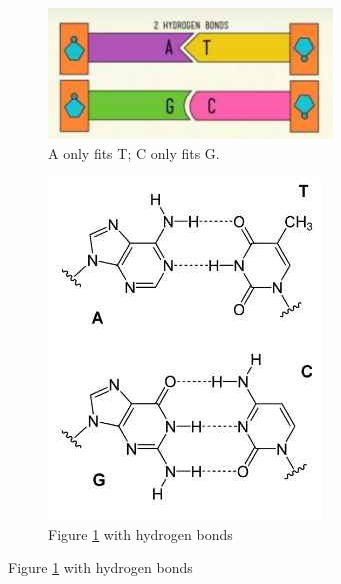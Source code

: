 \documentclass[]{article}
\begin{document}
\begin{figure}[H]
		\caption{Base Pairs}
		\begin{subfigure}[t]{0.4\textwidth}
			\caption{A only fits T; C only fits G.}\label{fig:BasePairsML}
			\includegraphics[width=\textwidth]{BasePairsML}
		\end{subfigure}
		\begin{subfigure}[t]{0.55\textwidth}
			\caption{Figure \ref{fig:BasePairsML} with hydrogen bonds}\label{fig:BasePairsML_hydrogen_bonds}
			\includegraphics[width=\textwidth]{BasePairsML_hydrogen_bonds}
		\end{subfigure}
\end{figure}
\end{document}
